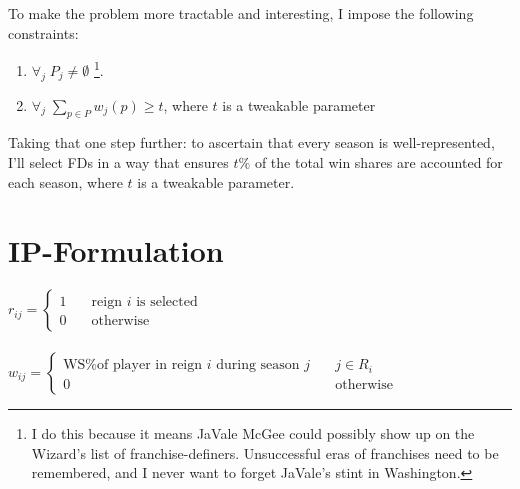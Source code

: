 \documentclass[a4paper,11pt]{article}
\begin{document}
To make the problem more tractable and interesting, I impose the following constraints:

\begin{enumerate}
\item $\forall_j \; P_j \ne \emptyset$ \footnote{I do this because it means JaVale McGee could possibly show up on the Wizard's list of franchise-definers. Unsuccessful eras of franchises need to be remembered, and I never want to forget JaVale's stint in Washington.}.
\item $\forall_j  \; \sum_{p \in P} w_j(p) \ge t$, where $t$ is a tweakable parameter
\end{enumerate}

Taking that one step further: to ascertain that every season is well-represented, I'll select FDs in a way that ensures $t\%$ of the total win shares are accounted for each season, where $t$ is a tweakable parameter. 



\section{IP-Formulation}

$r_{ij} = \left\{ \begin{array}{ll}
		            1 & \quad \text{reign } i \text{ is selected}\\
		            0 & \quad \text{otherwise}
		        \end{array}
 		   \right. $
\\
\\
$w_{ij} = \left\{ \begin{array}{ll}
		            \text{WS\% of player in reign } i \text{ during season } j & \quad j \in R_i\\
		            0 & \quad \text{otherwise}
		        \end{array}
 		   \right. $
\end{document}
